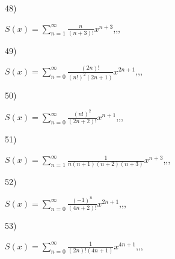 \documentclass[11pt, ukrainian]{article}
\begin{document}
\par
\vspace{0.9cm}
48) \space 
{%
{$S(x)=\sum\limits_{n=1}^{\infty}{\frac{n}{(n+3)!}}{x^{{n+3}}}$},,, \par \smallskip  
}
\par
\vspace{0.9cm}
49) \space 
{%
{$S(x)=\sum\limits_{n=0}^{\infty}{\frac{(2n)!}{(n!)^2(2n+1)}}{x^{{2n+1}}}$},,, \par \smallskip  
}
\par
\vspace{0.9cm}
50) \space 
{%
{$S(x)=\sum\limits_{n=0}^{\infty}{\frac{(n!)^2}{(2n+2)!}}{x^{{n+1}}}$},,, \par \smallskip  
}
\par
\newpage
51) \space 
{%
{$S(x)=\sum\limits_{n=1}^{\infty}{\frac{1}{n(n+1)(n+2)(n+3)}}{x^{{n+3}}}$},,, \par \smallskip  
}
\par
\vspace{0.9cm}
52) \space 
{%
{$S(x)=\sum\limits_{n=0}^{\infty}{\frac{(-1)^n}{(4n+2)!}}{x^{{2n+1}}}$},,, \par \smallskip  
}
\par
\vspace{0.9cm}
53) \space 
{%
{$S(x)=\sum\limits_{n=0}^{\infty}{\frac{1}{(2n)!(4n+1)}}{x^{{4n+1}}}$},,, \par \smallskip  
}
\end{document}
